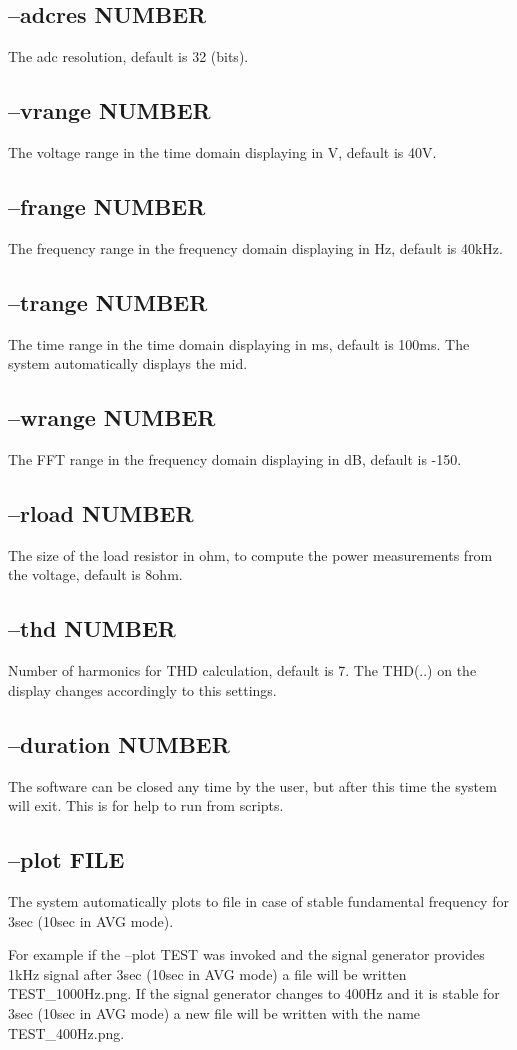 \documentclass[10pt,a4paper]{article}
\begin{document}
\subsection{--adcres NUMBER}
The adc resolution, default is 32 (bits).
\subsection{--vrange NUMBER}
The voltage range in the time domain displaying in V, default is 40V.
\subsection{--frange NUMBER}
The frequency range in the frequency domain displaying in Hz, default is 40kHz. 
\subsection{--trange NUMBER}
The time range in the time domain displaying in ms, default is 100ms. The system automatically displays the mid.
\subsection{--wrange NUMBER}
The FFT range in the frequency domain displaying in dB, default is -150.
\subsection{--rload NUMBER} 
The size of the load resistor in ohm, to compute the power measurements from the voltage, default is 8ohm.
\subsection{--thd NUMBER}
Number of harmonics for THD calculation, default is 7. The THD(..) on the display changes accordingly to this settings.
\subsection{--duration NUMBER}
The software can be closed any time by the user, but after this time the system will exit. This is for help to run from scripts.
\subsection{--plot FILE}
The system automatically plots to file in case of stable fundamental frequency for 3sec (10sec in AVG mode). 

For example if the --plot TEST was invoked and the signal generator provides 1kHz signal after 3sec (10sec in AVG mode) a file will be written TEST\_1000Hz.png. If the signal generator changes to 400Hz and it is stable for 3sec (10sec in AVG mode) a new file will be written with the name TEST\_400Hz.png.
\end{document}
